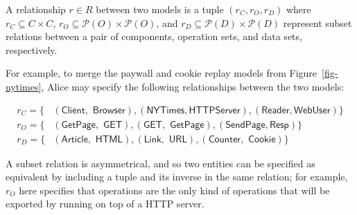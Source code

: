 \begin{defn} A relationship $r \in R$ between two models is a tuple
  $(r_{C}, r_{O}, r_{D})$ where $r_{C} \subseteq C \times C$, $r_{O}
  \subseteq \mathcal P (O) \times \mathcal P (O)$, and $r_{D}
  \subseteq \mathcal P (D) \times \mathcal P (D)$ represent subset
  relations between a pair of components, operation sets, and data
  sets, respectively.
\end{defn}
For example, to merge the paywall and cookie replay models from
Figure~\ref{fig-nytimes}, Alice may specify the following
relationships between the two models:
\begin{scriptsize}
\begin{align*}
  r_{C} = \{&(\textsf{Client$,$ Browser}),(\textsf{NYTimes$,$
    HTTPServer}), (\textsf{Reader$,$
    WebUser})\} \\
  r_{O} = \{&(\textsf{GetPage$,$ GET}), (\textsf{GET$,$ GetPage}),
  (\textsf{SendPage$,$
    Resp})\}\\
  r_{D} = \{&(\textsf{Article$,$ HTML}),(\textsf{Link$,$ URL}),
  (\textsf{Counter$,$ Cookie})\}
\end{align*}
\end{scriptsize}
A subset relation is asymmetrical, and so two entities can be
specified as equivalent by including a tuple and its inverse in the
same relation; for example, $r_{O}$ here specifies that
 operations are the only kind of 
operations that will be exported by  running on top of
a HTTP server.


